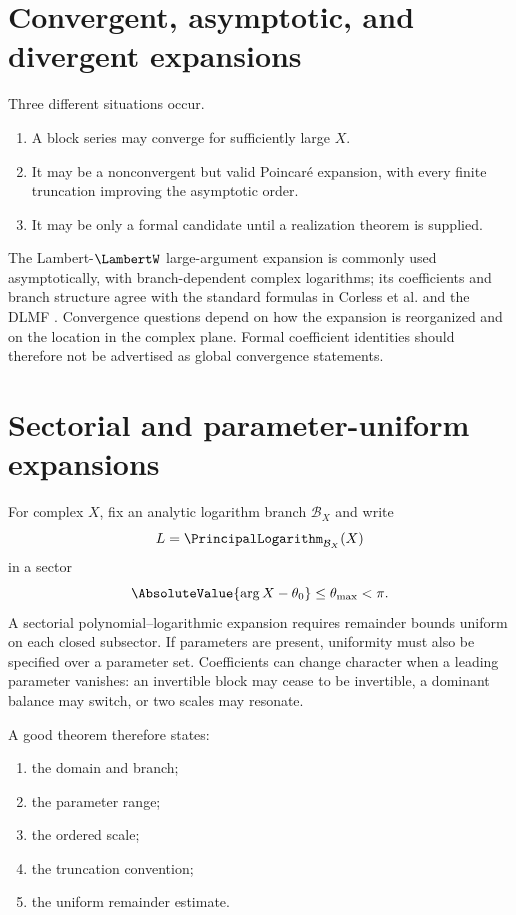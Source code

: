 \documentclass[11pt,oneside]{book}
\theoremstyle{definition}
\theoremstyle{remark}
\newcommand{\LogarithmOnBranch}[2]{%
  \PrincipalLogarithm_{#1}\!\left(#2\right)%
}
\begin{document}
\section{Convergent, asymptotic, and divergent expansions}
Three different situations occur.
\begin{enumerate}
\item A block series may converge for sufficiently large $X$.
\item It may be a nonconvergent but valid Poincar\'e expansion, with every
      finite truncation improving the asymptotic order.
\item It may be only a formal candidate until a realization theorem is
      supplied.
\end{enumerate}

The Lambert-$\LambertW$ large-argument expansion is commonly used asymptotically,
with branch-dependent complex logarithms; its coefficients and branch
structure agree with the standard formulas in Corless et al. and the DLMF
\cite{Corless1996,DLMF413}. Convergence questions depend on how the
expansion is reorganized and on the location in the complex plane. Formal
coefficient identities should therefore not be advertised as global
convergence statements.

\section{Sectorial and parameter-uniform expansions}
For complex $X$, fix an analytic logarithm branch $\mathcal B_X$ and write
\[
 L=\LogarithmOnBranch{\mathcal B_X}{X}
\]
in a sector
\[
 \AbsoluteValue{\arg X-\theta_0}\le\theta_{\max}<\pi.
\]
A sectorial polynomial--logarithmic expansion requires remainder bounds
uniform on each closed subsector. If parameters are present, uniformity
must also be specified over a parameter set. Coefficients can change
character when a leading parameter vanishes: an invertible block may cease
to be invertible, a dominant balance may switch, or two scales may resonate.

A good theorem therefore states:
\begin{enumerate}
\item the domain and branch;
\item the parameter range;
\item the ordered scale;
\item the truncation convention;
\item the uniform remainder estimate.
\end{enumerate}
\end{document}

